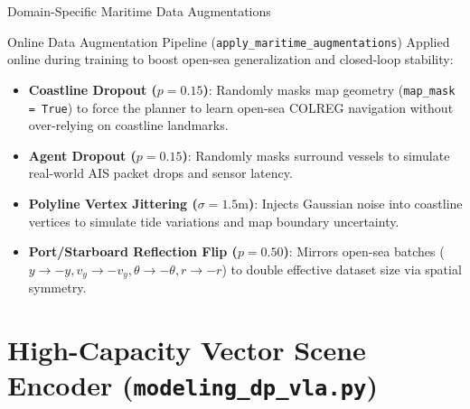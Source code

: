 \documentclass[t]{beamer}
\begin{document}
\begin{frame}{Domain-Specific Maritime Data Augmentations}
    \begin{block}{Online Data Augmentation Pipeline (\texttt{apply\_maritime\_augmentations})}
        Applied online during training to boost open-sea generalization and closed-loop stability:
    \end{block}

    \begin{itemize}
        \item \textbf{Coastline Dropout ($p=0.15$)}: Randomly masks map geometry (\texttt{map\_mask = True}) to force the planner to learn open-sea COLREG navigation without over-relying on coastline landmarks.
        \item \textbf{Agent Dropout ($p=0.15$)}: Randomly masks surround vessels to simulate real-world AIS packet drops and sensor latency.
        \item \textbf{Polyline Vertex Jittering ($\sigma=1.5\text{m}$)}: Injects Gaussian noise into coastline vertices to simulate tide variations and map boundary uncertainty.
        \item \textbf{Port/Starboard Reflection Flip ($p=0.50$)}: Mirrors open-sea batches ($y \to -y, v_y \to -v_y, \theta \to -\theta, r \to -r$) to double effective dataset size via spatial symmetry.
    \end{itemize}
\end{frame}

\section{High-Capacity Vector Scene Encoder (\texttt{modeling\_dp\_vla.py})}
\end{document}
